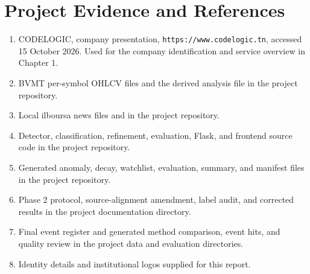 \chapter*{Project Evidence and References}

\begin{enumerate}
\item CODELOGIC, company presentation,
\texttt{https://www.codelogic.tn}, accessed 15 October 2026. Used for the
company identification and service overview in Chapter 1.

\item BVMT per-symbol OHLCV files and the derived
 analysis file in the project repository.

\item Local ilboursa news files and  in the
project repository.

\item Detector, classification, refinement, evaluation, Flask, and frontend
source code in the project repository.

\item Generated anomaly, decay, watchlist, evaluation, summary, and manifest
files in the project repository.

\item Phase 2 protocol, source-alignment amendment, label audit, and corrected
results in the project documentation directory.

\item Final event register and generated method comparison, event hits,
and quality review in the project data and evaluation directories.

\item Identity details and institutional logos supplied for this report.
\end{enumerate}

\clearpage
